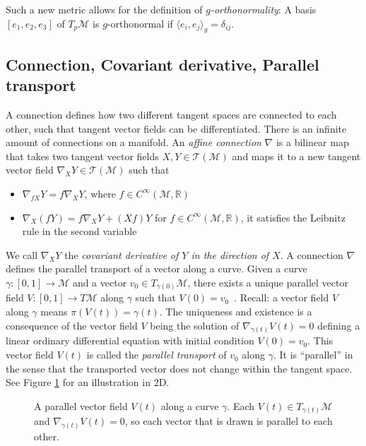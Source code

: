 \documentclass[../thesis.tex]{subfiles}
\begin{document}
Such a new metric allows for the definition of \emph{$g$-orthonormality}:
A basis $[e_1, e_2, e_3]$ of $T_p\mathcal{M}$ is $g$-orthonormal if $\langle e_i, e_j \rangle_g = \delta_{ij}$.

\subsection{Connection, Covariant derivative, Parallel transport}
A connection defines how two different tangent spaces are connected to each other, such that tangent vector fields
can be differentiated. There is an infinite amount of connections on a manifold.
An \emph{affine connection} $\nabla$ is a bilinear map that takes two tangent vector fields $X,Y \in \mathcal{T}(\mathcal{M})$ and maps it
to a new tangent vector field $\nabla_XY \in \mathcal{T}(\mathcal{M})$ such that
\begin{itemize}
  \item $\nabla_{fX}Y = f \nabla_XY$, where $f\in C^{\infty}(\mathcal{M}, \mathbb{R})$
  \item $\nabla_X(fY) = f\nabla_XY + (Xf)Y$ for $f\in C^{\infty}(\mathcal{M}, \mathbb{R})$, it satisfies the Leibnitz rule in the second variable
\end{itemize}
We call $\nabla_XY$ the \emph{covariant derivative of $Y$ in the direction of $X$}.
A connection $\nabla$ defines the parallel transport
of a vector along a curve. Given a curve $\gamma: [0,1] \to \mathcal{M}$ and
a vector $v_0 \in T_{\gamma(0)}\mathcal{M}$, there exists a unique parallel vector field $V: [0,1] \to T\mathcal{M}$ along $\gamma$
such that $V(0) = v_0$~\cite{LeeCurvature}.
Recall: a vector field $V$ along $\gamma$ means $\pi(V(t))=\gamma(t)$.
The uniqueness and existence is a consequence of the vector field $V$ being the solution
of $\nabla_{\dot{\gamma}(t)}V(t) = 0$ defining a linear ordinary differential equation with initial condition
$V(0)=v_0$. This vector field $V(t)$ is called the \emph{parallel transport} of $v_0$ along $\gamma$.
It is ``parallel'' in the sense that the transported vector does not change within the tangent space.
See Figure \ref{fig:vectorfield} for an illustration in 2D.
\begin{figure}[htb]
  \centering
  \def\svgwidth{20em}
  
  \caption{A parallel vector field $V(t)$ along a curve $\gamma$. Each $V(t)\in T_{\gamma(t)}\mathcal{M}$ and
  $\nabla_{\dot{\gamma}(t)}V(t) = 0$, so each vector that is drawn is parallel to each other.}
  \label{fig:vectorfield}
\end{figure}
\end{document}
